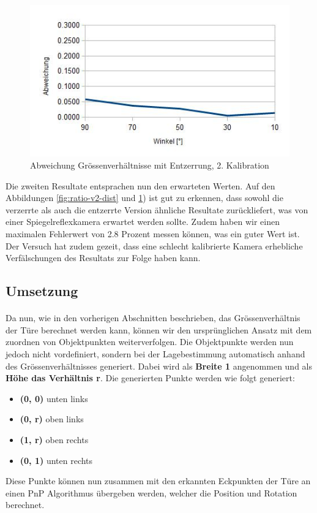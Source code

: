 \begin{figure}[!ht]
  \centering
  \includegraphics[width=0.75\linewidth]{images/ratio_v2_undist.jpg}
  \caption{Abweichung Grössenverhältnisse mit Entzerrung, 2. Kalibration}
  \label{fig:ratio-v2-undist}
\end{figure}

\noindent
Die zweiten Resultate entsprachen nun den erwarteten Werten. Auf den Abbildungen \ref{fig:ratio-v2-dist} und \ref{fig:ratio-v2-undist}) ist gut zu erkennen, dass sowohl die verzerrte als auch die entzerrte Version ähnliche Resultate zurückliefert, was von einer Spiegelreflexkamera erwartet werden sollte. Zudem haben wir einen maximalen Fehlerwert von 2.8 Prozent messen können, was ein guter Wert ist. Der Versuch hat zudem gezeit, dass eine schlecht kalibrierte Kamera erhebliche Verfälschungen des Resultats zur Folge haben kann. 


\subsection{Umsetzung}
\label{sec:projektion-door}

\paragraph{}
Da nun, wie in den vorherigen Abschnitten beschrieben, das Grössenverhältnis der Türe berechnet werden kann, können wir den ursprünglichen Ansatz mit dem zuordnen von Objektpunkten weiterverfolgen. Die Objektpunkte werden nun jedoch nicht vordefiniert, sondern bei der Lagebestimmung automatisch anhand des Grössenverhältnisses generiert. Dabei wird als \textbf{Breite 1} angenommen und als \textbf{Höhe das Verhältnis r}. Die generierten Punkte werden wie folgt generiert:

\begin{itemize}
\item \textbf{(0, 0)} unten links
\item \textbf{(0, r)} oben links
\item \textbf{(1, r)} oben rechts
\item \textbf{(0, 1)} unten rechts
\end{itemize}
\noindent
Diese Punkte können nun zusammen mit den erkannten Eckpunkten der Türe an einen PnP Algorithmus übergeben werden, welcher die Position und Rotation berechnet.

